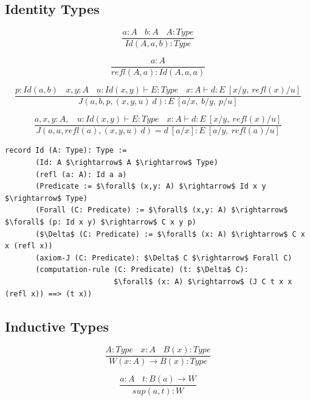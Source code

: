 \documentclass[11pt,oneside]{article}
\begin{document}
  \subsection{Identity Types}

\begin{equation}
\tag{$Id$-formation}
\dfrac
  {a:A\ \ \ \ b:A\ \ \ \ A:Type}
  {Id(A,a,b) : Type}
\end{equation}

\begin{equation}
\tag{$Id$-intro}
\dfrac
  {a:A}
  {refl(A,a) : Id(A,a,a) }
\end{equation}

\begin{equation}
\tag{$J$-elimination}
\dfrac
  {p:Id(a,b)\ \ \ \ x,y:A\ \ \ \ u:Id(x,y) \vdash E:Type\ \ \ \ x:A \vdash d: E\ [x/y,\ refl(x)/u]}
  {J(a,b,p,(x,y,u)\ d) : E\ [a/x,\ b/y,\ p/u]}
\end{equation}


\begin{equation}
\tag{$Id$-computation}
\dfrac
  {a,x,y:A,\ \ \ \ u:Id(x,y) \vdash E:Type\ \ \ \ x:A \vdash d:E\ [x/y,\ refl(x)/u]}
  {J(a,a,refl(a),(x,y,u)\ d) = d\ [a/x] : E\ [a/y,\ refl(a)/u]}
\end{equation}

\begin{lstlisting}[mathescape=true]
record Id (A: Type): Type :=
       (Id: A $\rightarrow$ A $\rightarrow$ Type)
       (refl (a: A): Id a a)
       (Predicate := $\forall$ (x,y: A) $\rightarrow$ Id x y $\rightarrow$ Type)
       (Forall (C: Predicate) := $\forall$ (x,y: A) $\rightarrow$ $\forall$ (p: Id x y) $\rightarrow$ C x y p)
       ($\Delta$ (C: Predicate) := $\forall$ (x: A) $\rightarrow$ C x x (refl x))
       (axiom-J (C: Predicate): $\Delta$ C $\rightarrow$ Forall C)
       (computation-rule (C: Predicate) (t: $\Delta$ C):
                         $\forall$ (x: A) $\rightarrow$ (J C t x x (refl x)) ==> (t x))
\end{lstlisting}

\subsection{Inductive Types}

\begin{equation}
\tag{$W$-formation}
\dfrac
  {A:Type\ \ \ \ x:A\ \ \ \ B(x):Type}
  {W (x:A) \rightarrow B(x) : Type}
\end{equation}

\begin{equation}
\tag{$W$-intro}
\dfrac
  {a:A\ \ \ \ t: B(a) \rightarrow W}
  {sup(a,t) : W}
\end{equation}
\end{document}
